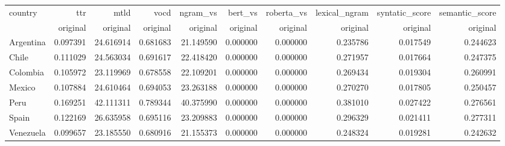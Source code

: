 \begin{tabular}{lrrrrrrrrr}
\toprule
country & ttr & mtld & vocd & ngram_vs & bert_vs & roberta_vs & lexical_ngram & syntatic_score & semantic_score \\
 & original & original & original & original & original & original & original & original & original \\
\midrule
Argentina & 0.097391 & 24.616914 & 0.681683 & 21.149590 & 0.000000 & 0.000000 & 0.235786 & 0.017549 & 0.244623 \\
Chile & 0.111029 & 24.563034 & 0.691617 & 22.418420 & 0.000000 & 0.000000 & 0.271957 & 0.017664 & 0.247375 \\
Colombia & 0.105972 & 23.119969 & 0.678558 & 22.109201 & 0.000000 & 0.000000 & 0.269434 & 0.019304 & 0.260991 \\
Mexico & 0.107884 & 24.610464 & 0.694053 & 23.263188 & 0.000000 & 0.000000 & 0.270270 & 0.017805 & 0.250457 \\
Peru & 0.169251 & 42.111311 & 0.789344 & 40.375990 & 0.000000 & 0.000000 & 0.381010 & 0.027422 & 0.276561 \\
Spain & 0.122169 & 26.635958 & 0.695116 & 23.209883 & 0.000000 & 0.000000 & 0.296329 & 0.021411 & 0.277311 \\
Venezuela & 0.099657 & 23.185550 & 0.680916 & 21.155373 & 0.000000 & 0.000000 & 0.248324 & 0.019281 & 0.242632 \\
\bottomrule
\end{tabular}
